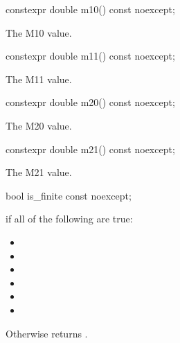 \begin{itemdecl}
constexpr double m10() const noexcept;
\end{itemdecl}
\begin{itemdescr}
\pnum
\returns
The M10 value.
\end{itemdescr}

\begin{itemdecl}
constexpr double m11() const noexcept;
\end{itemdecl}
\begin{itemdescr}
\pnum
\returns
The M11 value.
\end{itemdescr}

\begin{itemdecl}
constexpr double m20() const noexcept;
\end{itemdecl}
\begin{itemdescr}
\pnum
\returns
The M20 value.
\end{itemdescr}

\begin{itemdecl}
constexpr double m21() const noexcept;
\end{itemdecl}
\begin{itemdescr}
\pnum
\returns
The M21 value.
\end{itemdescr}

\begin{itemdecl}
bool is_finite const noexcept;
\end{itemdecl}
\begin{itemdescr}
\pnum
\returns
{} if all of the following are true:
\begin{itemize}
\item {}
\item {}
\item {}
\item {}
\item {}
\item {}
\end{itemize}

\pnum
Otherwise returns .
\end{itemdescr}

